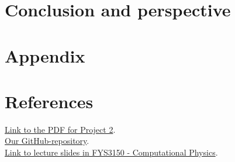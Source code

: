 \documentclass{article}
\begin{document}
\begin{multicols}{2}
\vspace{1cm}

\section{Conclusion and perspective} \label{sec:Conclusion}



\vspace{1cm}

\section{Appendix} \label{sec:Appendix}

\iffalse
\begin{figure}[ht]
	\centering
	\texttt{[image: program/data10.png]}
	\caption{The plot of the different algorithms for $n = 10$. }
  \label{fig:data10png}
\end{figure}
\fi



\clearpage

\vspace{1cm}

\section{References} \label{sec:References}


\href{https://github.com/CompPhysics/ComputationalPhysics/blob/master/doc/Projects/2019/Project2/pdf/Project2.pdf}{Link to the PDF for Project 2}. \\

\href{https://github.com/Erikbgram/Fys3150}{Our GitHub-repository}. \\

\href{https://github.com/CompPhysics/ComputationalPhysics/blob/master/doc/Lectures/lectures2015.pdf}{Link to lecture slides in FYS3150 - Computational Physics}.









\end{multicols}
\end{document}
